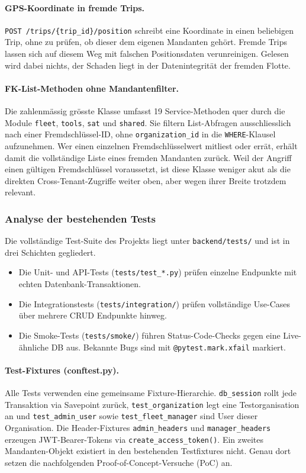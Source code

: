 \paragraph{GPS-Koordinate in fremde Trips.}
\texttt{POST /trips/\{trip\_id\}/\allowbreak position} schreibt eine
Koordinate in einen beliebigen Trip, ohne zu prüfen, ob dieser dem
eigenen Mandanten gehört. Fremde Trips lassen sich auf diesem Weg mit
falschen Positionsdaten verunreinigen. Gelesen wird dabei nichts, der
Schaden liegt in der Datenintegrität der fremden Flotte.

\paragraph{FK-List-Methoden ohne Mandantenfilter.}
Die zahlenmässig grösste Klasse umfasst 19 Service-Methoden quer durch
die Module \texttt{fleet}, \texttt{tools}, \texttt{sat} und
\texttt{shared}. Sie filtern List-Abfragen ausschliesslich nach einer
Fremdschlüssel-ID, ohne \texttt{organization\_id} in die
\texttt{WHERE}-Klausel aufzunehmen. Wer einen einzelnen
Fremdschlüsselwert mitliest oder errät, erhält damit die vollständige
Liste eines fremden Mandanten zurück. Weil der Angriff einen gültigen
Fremdschlüssel voraussetzt, ist diese Klasse weniger akut als die
direkten Cross-Tenant-Zugriffe weiter oben, aber wegen ihrer Breite
trotzdem relevant.


\subsubsection{Analyse der bestehenden Tests}

Die vollständige Test-Suite des Projekts liegt unter \texttt{backend/tests/} und ist
in drei Schichten gegliedert.

\begin{itemize}
    \item Die Unit- und API-Tests (\texttt{tests/test\_*.py}) prüfen
          einzelne Endpunkte mit echten Datenbank-Transaktionen.
    \item Die Integrationstests (\texttt{tests/integration/}) prüfen
          vollständige Use-Cases über mehrere CRUD Endpunkte hinweg.
    \item Die Smoke-Tests (\texttt{tests/smoke/}) führen
          Status-Code-Checks gegen eine Live-ähnliche DB aus. Bekannte
          Bugs sind mit \texttt{@pytest.mark.xfail} markiert.
\end{itemize}

\paragraph{Test-Fixtures (conftest.py).}
Alle Tests verwenden eine gemeinsame Fixture-Hierarchie. \texttt{db\_session}
rollt jede Transaktion via Savepoint zurück, \texttt{test\_organization} legt
eine Testorganisation an und \texttt{test\_admin\_user} sowie
\texttt{test\_fleet\_manager} sind User dieser Organisation. Die
Header-Fixtures \texttt{admin\_headers} und \texttt{manager\_headers}
erzeugen JWT-Bearer-Tokens via
\texttt{create\_access\_token()}. Ein
zweites Mandanten-Objekt existiert in den bestehenden Testfixtures
nicht. Genau dort setzen die nachfolgenden Proof-of-Concept-Versuche
(PoC) an.

